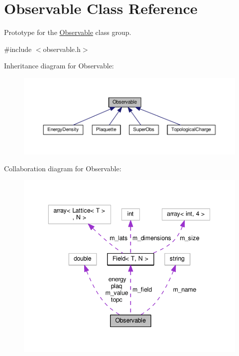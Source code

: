 \hypertarget{classObservable}{}\section{Observable Class Reference}
\label{classObservable}


Prototype for the \hyperlink{classObservable}{Observable} class group.  




{\ttfamily \#include $<$observable.\+h$>$}



Inheritance diagram for Observable\+:\nopagebreak
\begin{figure}[H]
\begin{center}
\leavevmode
\includegraphics[width=350pt]{d7/d7e/classObservable__inherit__graph}
\end{center}
\end{figure}


Collaboration diagram for Observable\+:\nopagebreak
\begin{figure}[H]
\begin{center}
\leavevmode
\includegraphics[width=343pt]{df/da6/classObservable__coll__graph}
\end{center}
\end{figure}
